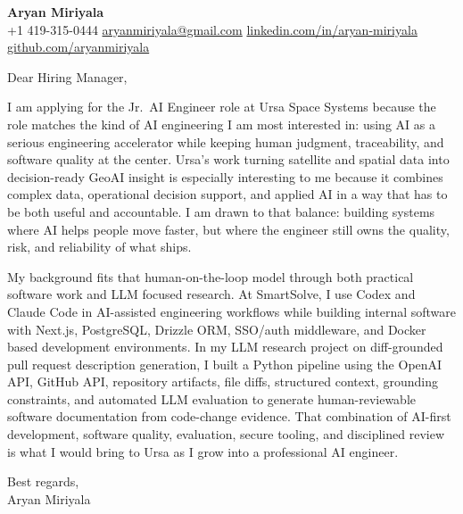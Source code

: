 \documentclass[letterpaper,11pt]{article}
\begin{document}
\begin{center}
    {\Large \textbf{Aryan Miriyala}}\\
    \vspace{2pt}
    +1 419-315-0444 \textbar{} \href{mailto:aryanmiriyala@gmail.com}{aryanmiriyala@gmail.com} \textbar{} \href{https://www.linkedin.com/in/aryan-miriyala-7788a21b6/}{linkedin.com/in/aryan-miriyala} \textbar{} \href{https://github.com/aryanmiriyala}{github.com/aryanmiriyala}
\end{center}

\vspace{10pt}

Dear Hiring Manager,

I am applying for the Jr.\ AI Engineer role at Ursa Space Systems because the role matches the kind of AI engineering I am most interested in: using AI as a serious engineering accelerator while keeping human judgment, traceability, and software quality at the center. Ursa's work turning satellite and spatial data into decision-ready GeoAI insight is especially interesting to me because it combines complex data, operational decision support, and applied AI in a way that has to be both useful and accountable. I am drawn to that balance: building systems where AI helps people move faster, but where the engineer still owns the quality, risk, and reliability of what ships.

My background fits that human-on-the-loop model through both practical software work and LLM focused research. At SmartSolve, I use Codex and Claude Code in AI-assisted engineering workflows while building internal software with Next.js, PostgreSQL, Drizzle ORM, SSO/auth middleware, and Docker based development environments. In my LLM research project on diff-grounded pull request description generation, I built a Python pipeline using the OpenAI API, GitHub API, repository artifacts, file diffs, structured context, grounding constraints, and automated LLM evaluation to generate human-reviewable software documentation from code-change evidence. That combination of AI-first development, software quality, evaluation, secure tooling, and disciplined review is what I would bring to Ursa as I grow into a professional AI engineer.

\vspace{8pt}

Best regards,\\
Aryan Miriyala
\end{document}
